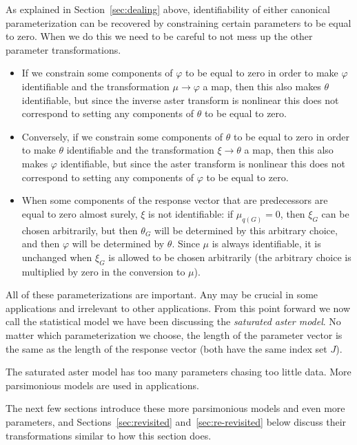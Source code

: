 As explained in Section~\ref{sec:dealing} above, identifiability of either
canonical parameterization can be recovered by constraining certain parameters
to be equal to zero.  When we do this we need to be careful to not mess up
the other parameter transformations.
\begin{itemize}
\item If we constrain some components of $\varphi$ to be equal to zero in
    order to make $\varphi$ identifiable and the transformation
    $\mu \to \varphi$ a map, then this also makes $\theta$ identifiable,
    but since the inverse aster transform is nonlinear this does not
    correspond to setting any components of $\theta$ to be equal to zero.
\item Conversely, if we constrain some components of $\theta$ to be equal
    to zero in order to make $\theta$ identifiable and the transformation
    $\xi \to \theta$ a map, then this also makes $\varphi$ identifiable,
    but since the aster transform is nonlinear this does not
    correspond to setting any components of $\varphi$ to be equal to zero.
\item When some components of the response vector that are predecessors
    are equal to zero almost surely, $\xi$ is not identifiable:
    if $\mu_{q(G)} = 0$, then $\xi_G$ can be chosen arbitrarily,
    but then $\theta_G$ will be determined by this arbitrary choice,
    and then $\varphi$ will be determined by $\theta$.
    Since $\mu$ is always identifiable, it is unchanged when $\xi_G$
    is allowed to be chosen arbitrarily (the arbitrary choice is multiplied
    by zero in the conversion to $\mu$).
\end{itemize}

All of these parameterizations are important.  Any may be crucial in
some applications and irrelevant to other applications.  From this point
forward we now call the statistical model we have been discussing the
\emph{saturated aster model}.  No matter which parameterization we choose,
the length of the parameter vector is the same as the length of the response
vector (both have the same index set $J$).

The saturated aster model has too many parameters chasing too little data.
More parsimonious models are used in applications.

The next few sections introduce these more parsimonious models and
even more parameters,
and Sections~\ref{sec:revisited} and~\ref{sec:re-revisited} below
discuss their transformations similar to how this section does.

